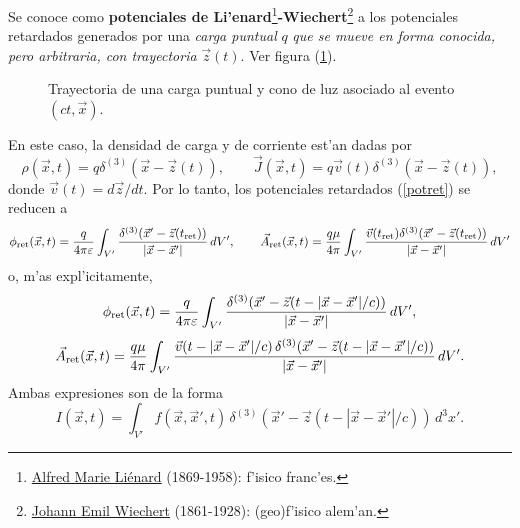 Se conoce como \textbf{potenciales de Li'enard}\footnote{\href{https://en.wikipedia.org/wiki/Alfred-Marie_Li\%C3\%A9nard}{Alfred Marie Li\'enard} (1869-1958): f'isico franc'es.}\textbf{-Wiechert}\footnote{\href{https://en.wikipedia.org/wiki/Emil_Wiechert}{Johann Emil Wiechert} (1861-1928): (geo)f'isico alem'an.} a los potenciales retardados generados por una \textit{carga puntual} $q$ \textit{que se mueve en forma conocida, pero arbitraria, con trayectoria} $\vec{z}(t)$. Ver figura (\ref{fig:LW}).
\begin{figure}[ht]
\centerline{}
\caption{Trayectoria de una carga puntual y cono de luz asociado al evento $(ct,\vec{x})$.}
\label{fig:LW}
\end{figure}
En este caso, la densidad de carga y de corriente est'an dadas por
\begin{equation}
\rho(\vec{x},t)=q\delta^{(3)}(\vec{x}-\vec{z}(t)), \qquad
\vec{J}(\vec{x},t)=q\vec{v}(t)\delta^{(3)}(\vec{x}-\vec{z}(t)),
\end{equation}
donde $\vec{v}(t)={d\vec{z}}/{dt}$. Por lo tanto, los potenciales retardados (\ref{potret}) se reducen a
\begin{equation}
\phi_{\rm ret}(\vec{x},t)=\frac{q}{4\pi\varepsilon}\int_{V'}
\frac{\delta^{(3)}(\vec{x}'-\vec{z}(t_{\rm ret}))}{|\vec{x}-\vec{x}'|}\,dV', \qquad
\vec{A}_{\rm ret}(\vec{x},t)=\frac{q\mu}{4\pi}\int_{V'}
\frac{\vec{v}(t_{\rm ret})\delta^{(3)}(\vec{x}'-\vec{z}(t_{\rm ret}))}{|\vec{x}-\vec{x}'|}\,dV'  \label{potretq1}
\end{equation}
o, m'as expl'icitamente,
\begin{equation}
\phi_{\rm ret}(\vec{x},t)=\frac{q}{4\pi\varepsilon}\int_{V'}
\frac{\delta^{(3)}(\vec{x}'-\vec{z}(t-|\vec{x}-\vec{x}'|/c))}{|\vec{x}-\vec{x}'|}\,dV', \end{equation}
\begin{equation}
\vec{A}_{\rm ret}(\vec{x},t)=\frac{q\mu}{4\pi}\int_{V'}
\frac{\vec{v}(t-|\vec{x}-\vec{x}'|/c)\,\delta^{(3)}(\vec{x}'-\vec{z}(t-|\vec{x}-\vec{x}'|/c))}{|\vec{x}-\vec{x}'|}\,dV' . \label{potretq2}
\end{equation}
Ambas expresiones son de la forma
\begin{equation}
I(\vec{x},t)=\int_{V'}
f(\vec{x},\vec{x}',t)\,\delta^{(3)}(\vec{x}'-\vec{z}(t-|\vec{x}-\vec{x}'|/c))\,d^3x' . \label{potretqg1}
\end{equation}


